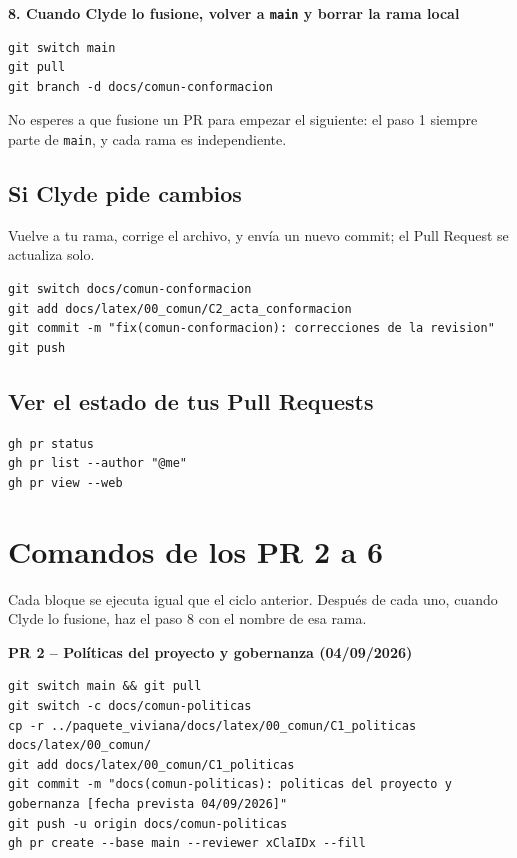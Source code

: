 \documentclass[11pt,a4paper]{article}
\begin{document}
\vspace{0.1cm}
\noindent\textbf{8. Cuando Clyde lo fusione, volver a \texttt{main} y borrar la rama local}
\begin{lstlisting}
git switch main
git pull
git branch -d docs/comun-conformacion
\end{lstlisting}

\noindent No esperes a que fusione un PR para empezar el siguiente: el paso 1 siempre parte de \texttt{main}, y cada rama es independiente.

\subsection{Si Clyde pide cambios}
Vuelve a tu rama, corrige el archivo, y envía un nuevo commit; el Pull Request se actualiza solo.
\begin{lstlisting}
git switch docs/comun-conformacion
git add docs/latex/00_comun/C2_acta_conformacion
git commit -m "fix(comun-conformacion): correcciones de la revision"
git push
\end{lstlisting}

\subsection{Ver el estado de tus Pull Requests}
\begin{lstlisting}
gh pr status
gh pr list --author "@me"
gh pr view --web
\end{lstlisting}

\section{Comandos de los PR 2 a 6}
Cada bloque se ejecuta igual que el ciclo anterior. Después de cada uno, cuando Clyde lo fusione, haz el paso 8 con el nombre de esa rama.

\noindent\textbf{PR 2 -- Políticas del proyecto y gobernanza (04/09/2026)}
\begin{lstlisting}
git switch main && git pull
git switch -c docs/comun-politicas
cp -r ../paquete_viviana/docs/latex/00_comun/C1_politicas docs/latex/00_comun/
git add docs/latex/00_comun/C1_politicas
git commit -m "docs(comun-politicas): politicas del proyecto y gobernanza [fecha prevista 04/09/2026]"
git push -u origin docs/comun-politicas
gh pr create --base main --reviewer xClaIDx --fill
\end{lstlisting}
\end{document}
